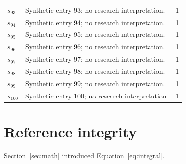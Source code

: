 \documentclass[11pt,a4paper]{article}
\begin{document}
\begin{longtable}{p{.15\linewidth}p{.55\linewidth}p{.15\linewidth}}
$s_{93}$ & Synthetic entry 93; no research interpretation. & 1 \\
$s_{94}$ & Synthetic entry 94; no research interpretation. & 1 \\
$s_{95}$ & Synthetic entry 95; no research interpretation. & 1 \\
$s_{96}$ & Synthetic entry 96; no research interpretation. & 1 \\
$s_{97}$ & Synthetic entry 97; no research interpretation. & 1 \\
$s_{98}$ & Synthetic entry 98; no research interpretation. & 1 \\
$s_{99}$ & Synthetic entry 99; no research interpretation. & 1 \\
$s_{100}$ & Synthetic entry 100; no research interpretation. & 1 \\
\end{longtable}
\section{Reference integrity}
Section~\ref{sec:math} introduced Equation~\eqref{eq:integral}.
\begingroup\raggedright\endgroup
\end{document}
